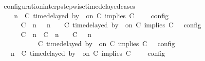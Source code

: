 \begin{isabellebody}
\isamarkupfalse%
%
\endisatagproof
{\isafoldproof}%
%
\isadelimproof
\isanewline
%
\endisadelimproof
\isanewline
{}\isamarkupfalse%
\ configuration{\isacharunderscore}interp{\isacharunderscore}stepwise{\isacharunderscore}timedelayed{\isacharunderscore}cases{\isacharcolon}\isanewline
\ \ {\isacartoucheopen}{\isasymlbrakk}\ {\isasymGamma}{\isacharcomma}\ n\ {\isasymTurnstile}\ {\isacharparenleft}{\isacharparenleft}C\ time{\isacharminus}delayed\ by\ {\isasymdelta}{\isasymtau}\ on\ C\ implies\ C\ {\isacharhash}\ {\isasymPsi}{\isacharparenright}\ {\isasymtriangleright}\ {\isasymPhi}\ {\isasymrbrakk}\isactrlsub c\isactrlsub o\isactrlsub n\isactrlsub f\isactrlsub i\isactrlsub g\isanewline
\ \ \ \ {\isacharequal}\ {\isasymlbrakk}\ {\isacharparenleft}{\isacharparenleft}C\ {\isasymnot}{\isasymUp}\ n{\isacharparenright}\ {\isacharhash}\ {\isasymGamma}{\isacharparenright}{\isacharcomma}\ n\ {\isasymTurnstile}\ {\isasymPsi}\ {\isasymtriangleright}\ {\isacharparenleft}{\isacharparenleft}C\ time{\isacharminus}delayed\ by\ {\isasymdelta}{\isasymtau}\ on\ C\ implies\ C\ {\isacharhash}\ {\isasymPhi}{\isacharparenright}\ {\isasymrbrakk}\isactrlsub c\isactrlsub o\isactrlsub n\isactrlsub f\isactrlsub i\isactrlsub g\isanewline
\ \ \ \ {\isasymunion}\ {\isasymlbrakk}\ {\isacharparenleft}{\isacharparenleft}C\ {\isasymUp}\ n{\isacharparenright}\ {\isacharhash}\ {\isacharparenleft}C\ {\isacharat}\ n\ {\isasymoplus}\ {\isasymdelta}{\isasymtau}\ {\isasymRightarrow}\ C\ {\isacharhash}\ {\isasymGamma}{\isacharparenright}{\isacharcomma}\ n\isanewline
\ \ \ \ \ \ \ \ {\isasymTurnstile}\ {\isasymPsi}\ {\isasymtriangleright}\ {\isacharparenleft}{\isacharparenleft}C\ time{\isacharminus}delayed\ by\ {\isasymdelta}{\isasymtau}\ on\ C\ implies\ C\ {\isacharhash}\ {\isasymPhi}{\isacharparenright}\ {\isasymrbrakk}\isactrlsub c\isactrlsub o\isactrlsub n\isactrlsub f\isactrlsub i\isactrlsub g{\isacartoucheclose}\isanewline
%
\isadelimproof
%
\endisadelimproof
%
\isatagproof
{}\isamarkupfalse%
\ {\isacharminus}\isanewline
\ \ \isamarkupfalse%
\ {}{\isacharcolon}{\isacartoucheopen}{\isasymlbrakk}\ {\isasymGamma}{\isacharcomma}\ n\ {\isasymTurnstile}\ {\isacharparenleft}C\ time{\isacharminus}delayed\ by\ {\isasymdelta}{\isasymtau}\ on\ C\ implies\ C\ {\isacharhash}\ {\isasymPsi}\ {\isasymtriangleright}\ {\isasymPhi}\ {\isasymrbrakk}\isactrlsub c\isactrlsub o\isactrlsub n\isactrlsub f\isactrlsub i\isactrlsub g\isanewline

\end{isabellebody}
